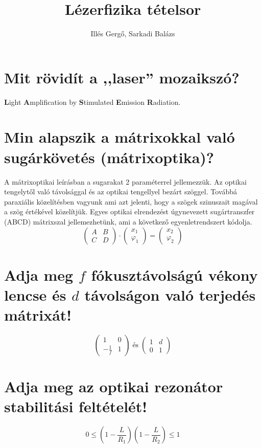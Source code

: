 \documentclass[12pt, a4paper]{article}
\title{\bfseries Lézerfizika tételsor}
\author{Illés Gergő, Sarkadi Balázs}
\begin{document}
\maketitle

\section{Mit rövidít a ,,laser'' mozaikszó?}
\textbf Light \textbf Amplification by \textbf Stimulated \textbf Emission \textbf Radiation.

\section{Min alapszik a mátrixokkal való sugárkövetés (mátrixoptika)?}
A mátrixoptikai leírásban a sugarakat 2 paraméterrel jellemezzük. Az optikai tengelytől való távolsággal és az optikai tengellyel bezárt szöggel. Továbbá paraxiális közelítésben vagyunk ami azt jelenti, hogy a szögek szinuszait magával a szög értékével közelítjük. Egyes optikai elrendezést úgynevezett sugártranszfer (ABCD) mátrixszal jellemezhetünk, ami a következő egyenletrendszert kódolja.
\begin{equation}
\begin{pmatrix}
A&B\\C&D
\end{pmatrix}\cdot
\begin{pmatrix}
x_1\\\varphi_1
\end{pmatrix}=\begin{pmatrix}
x_2\\\varphi_2
\end{pmatrix}
\end{equation}

\section{Adja meg $f$ fókusztávolságú vékony lencse és $d$ távolságon való terjedés mátrixát!}
\begin{equation}
\begin{pmatrix}
1&0\\-\frac{1}{f}&1
\end{pmatrix}\;\text{és}\;
\begin{pmatrix}
1&d\\0&1
\end{pmatrix}
\end{equation}
\section{Adja meg az optikai rezonátor stabilitási feltételét!}
\begin{equation}
0\leq\left(1-\frac{L}{R_1}\right)\left(1-\frac{L}{R_2}\right)\leq 1
\end{equation}
\end{document}
